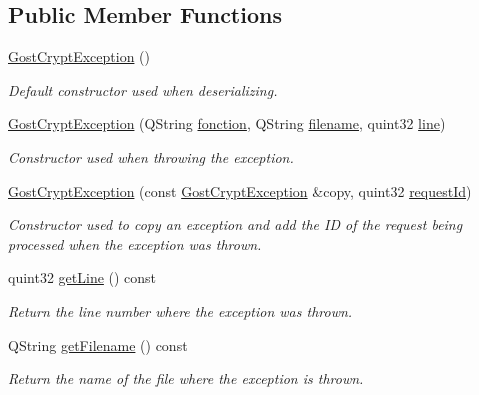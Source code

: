 \subsection*{Public Member Functions}
\begin{DoxyCompactItemize}
\item 
\hyperlink{class_gost_crypt_1_1_gost_crypt_exception_aaa8c5c0708b30d7ba1a7ab91a1276440}{Gost\+Crypt\+Exception} ()
\begin{DoxyCompactList}\small\item\em Default constructor used when deserializing. \end{DoxyCompactList}\item 
\hyperlink{class_gost_crypt_1_1_gost_crypt_exception_a8b135fb59e58e9f9aa75dc7fecc5cc82}{Gost\+Crypt\+Exception} (Q\+String \hyperlink{class_gost_crypt_1_1_gost_crypt_exception_a29b8c93d5efbb1ff369107385725a939}{fonction}, Q\+String \hyperlink{class_gost_crypt_1_1_gost_crypt_exception_a749a12375f4ba9d502623b99d8252f38}{filename}, quint32 \hyperlink{class_gost_crypt_1_1_gost_crypt_exception_abf506d911f12a4e969eea500f90bd32c}{line})
\begin{DoxyCompactList}\small\item\em Constructor used when throwing the exception. \end{DoxyCompactList}\item 
\hyperlink{class_gost_crypt_1_1_gost_crypt_exception_a43867c96f43a1b243c772b448d1f8987}{Gost\+Crypt\+Exception} (const \hyperlink{class_gost_crypt_1_1_gost_crypt_exception}{Gost\+Crypt\+Exception} \&copy, quint32 \hyperlink{class_gost_crypt_1_1_gost_crypt_exception_a7b4217ceb60c944a1ea2d38cd1ecacd0}{request\+Id})
\begin{DoxyCompactList}\small\item\em Constructor used to copy an exception and add the ID of the request being processed when the exception was thrown. \end{DoxyCompactList}\item 
quint32 \hyperlink{class_gost_crypt_1_1_gost_crypt_exception_a95bde6d8320f0337b1696309502ec40d}{get\+Line} () const
\begin{DoxyCompactList}\small\item\em Return the line number where the exception was thrown. \end{DoxyCompactList}\item 
Q\+String \hyperlink{class_gost_crypt_1_1_gost_crypt_exception_a3f390fae2e7330b75dd1297f749a2439}{get\+Filename} () const
\begin{DoxyCompactList}\small\item\em Return the name of the file where the exception is thrown. \end{DoxyCompactList}\item 

\end{DoxyCompactItemize}
